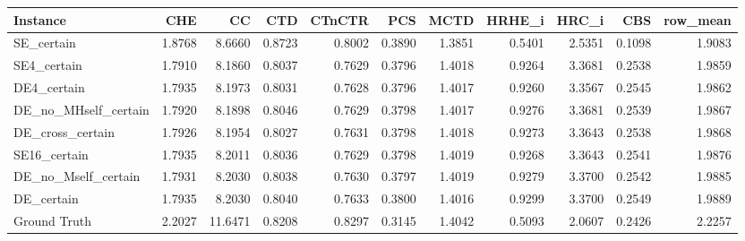 \begin{tabular}{lrrrrrrrrrr}
\toprule
Instance & CHE & CC & CTD & CTnCTR & PCS & MCTD & HRHE_i & HRC_i & CBS & row_mean \\
\midrule
SE_certain & 1.8768 & 8.6660 & 0.8723 & 0.8002 & 0.3890 & 1.3851 & 0.5401 & 2.5351 & 0.1098 & 1.9083 \\
SE4_certain & 1.7910 & 8.1860 & 0.8037 & 0.7629 & 0.3796 & 1.4018 & 0.9264 & 3.3681 & 0.2538 & 1.9859 \\
DE4_certain & 1.7935 & 8.1973 & 0.8031 & 0.7628 & 0.3796 & 1.4017 & 0.9260 & 3.3567 & 0.2545 & 1.9862 \\
DE_no_MHself_certain & 1.7920 & 8.1898 & 0.8046 & 0.7629 & 0.3798 & 1.4017 & 0.9276 & 3.3681 & 0.2539 & 1.9867 \\
DE_cross_certain & 1.7926 & 8.1954 & 0.8027 & 0.7631 & 0.3798 & 1.4018 & 0.9273 & 3.3643 & 0.2538 & 1.9868 \\
SE16_certain & 1.7935 & 8.2011 & 0.8036 & 0.7629 & 0.3798 & 1.4019 & 0.9268 & 3.3643 & 0.2541 & 1.9876 \\
DE_no_Mself_certain & 1.7931 & 8.2030 & 0.8038 & 0.7630 & 0.3797 & 1.4019 & 0.9279 & 3.3700 & 0.2542 & 1.9885 \\
DE_certain & 1.7935 & 8.2030 & 0.8040 & 0.7633 & 0.3800 & 1.4016 & 0.9299 & 3.3700 & 0.2549 & 1.9889 \\
Ground Truth & 2.2027 & 11.6471 & 0.8208 & 0.8297 & 0.3145 & 1.4042 & 0.5093 & 2.0607 & 0.2426 & 2.2257 \\
\bottomrule
\end{tabular}
